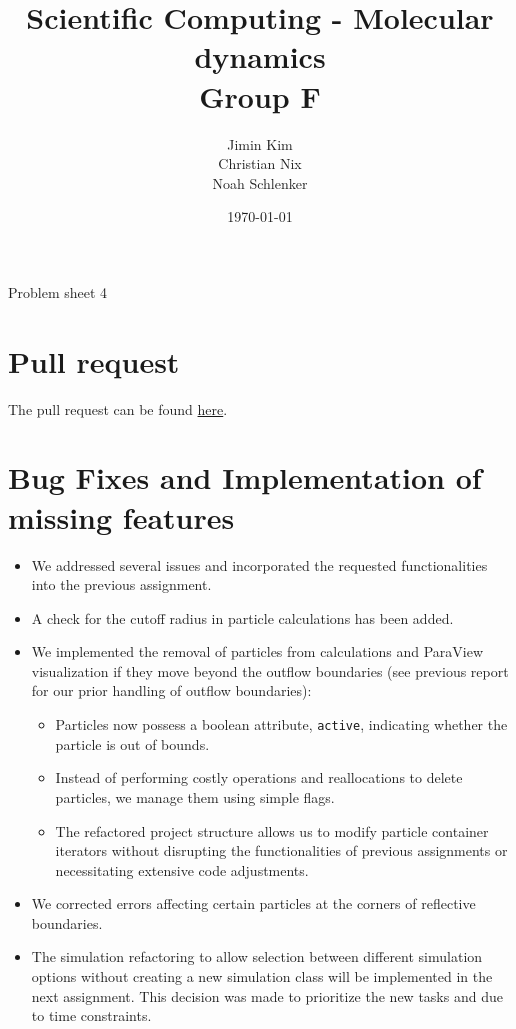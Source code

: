 \documentclass{article}
\title{Scientific Computing - Molecular dynamics \\ Group F}
\author{
    Jimin Kim \\
    Christian Nix \\
    Noah Schlenker
}
\date{\today}
\newcommand{\subtitle}{Problem sheet 4}
\begin{document}
\maketitle

\begin{center}
    \LARGE \subtitle{}
\end{center}

\section{Pull request}
\label{sec:pr}
The pull request can be found \href{https://github.com/noahpy/MolSim-SS24/pull/42}{here}.

\section{Bug Fixes and Implementation of missing features}
\label{sec:fix}

    \begin{itemize}
        \item We addressed several issues and incorporated the requested functionalities into the previous assignment.
        \item A check for the cutoff radius in particle calculations has been added.
        \item We implemented the removal of particles from calculations and ParaView visualization if they move beyond the outflow boundaries (see previous report for our prior handling of outflow boundaries):
        \begin{itemize}
            \item Particles now possess a boolean attribute, \texttt{active}, indicating whether the particle is out of bounds.
            \item Instead of performing costly operations and reallocations to delete particles, we manage them using simple flags.
            \item The refactored project structure allows us to modify particle container iterators without disrupting the functionalities of previous assignments or necessitating extensive code adjustments.
        \end{itemize}
        \item We corrected errors affecting certain particles at the corners of reflective boundaries.
        \item The simulation refactoring to allow selection between different simulation options without creating a new simulation class will be implemented in the next assignment. This decision was made to prioritize the new tasks and due to time constraints.
    \end{itemize}
\end{document}
